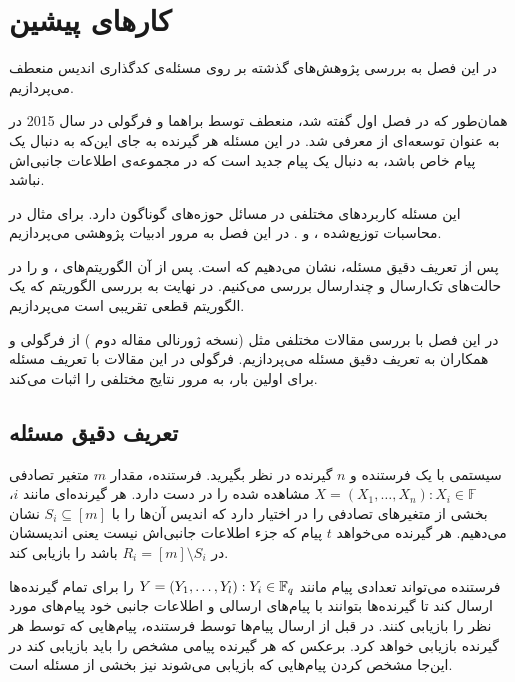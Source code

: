 \chapter{کارهای پیشین}
\label{chapter:literature}

در این فصل به بررسی پژوهش‌های گذشته بر روی مسئله‌ی کدگذاری اندیس منعطف می‌پردازیم.

همان‌طور که در فصل اول گفته شد، \picod منعطف توسط براهما و فرگولی در سال 2015 در
\cite{pliablefirstpaper}
به عنوان توسعه‌ای از \icod معرفی شد. در این مسئله هر گیرنده به جای این‌که به دنبال یک پیام خاص باشد، به دنبال یک پیام جدید است که در مجموعه‌ی اطلاعات جانبی‌‌اش نباشد.

این مسئله کاربردهای مختلفی در مسائل حوزه‌های گوناگون دارد. برای مثال در محاسبات توزیع‌شده
\cite{datashuf}،
\cite{8404065}
و
\cite{8682270}.
در این فصل به مرور ادبیات پژوهشی 
\picod
می‌پردازیم.

پس از تعریف دقیق مسئله، نشان می‌دهیم که 
\picod
\nphard 
است. پس از آن الگوریتم‌های
،
و
را در حالت‌های تک‌ارسال و چندارسال بررسی می‌کنیم. در نهایت به بررسی الگوریتم
که یک الگوریتم قطعی تقریبی است می‌پردازیم.

در این فصل با بررسی مقالات مختلفی مثل
\cite{pliablefirstpaper,6620405, pliable2015paper,  song2017polynomialtime}
(نسخه ژورنالی مقاله دوم
\cite{pliable2016})
از فرگولی و همکاران به تعریف دقیق مسئله می‌پردازیم. فرگولی در این مقالات با تعریف مسئله برای اولین بار، به مرور نتایج مختلفی را اثبات می‌کند.
\section{تعریف دقیق مسئله}
\label{sec:3:3}
	سیستمی با یک فرستنده و 
	$n$
	گیرنده در نظر بگیرید. فرستنده، مقدار
	$m$
	متغیر تصادفی
	$X = (X_1, \ldots, X_n): X_i \in \mathbb{F}$
	مشاهده شده را در دست دارد. هر گیرنده‌ای مانند 
	$i$،
	بخشی از متغیرهای تصادفی را در اختیار دارد که اندیس آن‌ها را با 
	$S_i \subseteq [m]$
	نشان می‌دهیم. هر گیرنده می‌خواهد 
	$t$
	پیام که جزء اطلاعات جانبی‌اش نیست یعنی اندیسشان در
	$R_i = [m] \setminus S_i$
	باشد را بازیابی کند.
	
	فرستنده می‌تواند تعدادی پیام مانند
	$Y = (Y_1, \ldots, Y_l): Y_i \in {\mathbb{F}_q}$
	را برای تمام گیرنده‌ها ارسال کند تا گیرنده‌ها بتوانند با پیام‌های ارسالی و اطلاعات جانبی خود پیام‌های مورد نظر را بازیابی کنند. در
	\picod
	قبل از ارسال پیام‌ها توسط فرستنده، پیام‌هایی که توسط هر گیرنده بازیابی خواهد کرد. برعکس 
	\icod
	 که هر گیرنده پیامی مشخص را باید بازیابی کند در این‌جا مشخص کردن پیام‌هایی که بازیابی می‌شوند نیز بخشی از مسئله است.
	 

